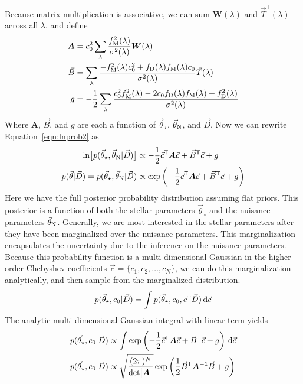 \documentclass[preprint]{aastex} %
\newcommand{\vt}{\vec{\theta}}
\newcommand{\vstar}{\vt_{\star}}
\newcommand{\vN}{\vt_{\rm N}}
\newcommand{\vc}{\vec{c}}
\newcommand{\fM}{f_{\rm M}}
\newcommand{\fD}{f_{\rm D}}
\newcommand{\vD}{\vec{D}}
\newcommand{\dd}{\,{\rm d}}
\newcommand{\trans}{\mathsf{T}}
\begin{document}
Because matrix multiplication is associative, we can sum ${\bm W(\lambda)}$ and $\vec{T}^\trans(\lambda)$ across all $\lambda$, and define
\begin{align}
  {\bm A} &= c_0^2 \sum_{\lambda} \frac{\fM^2(\lambda)}{\sigma^2(\lambda)} {\bm W}(\lambda) \\
  \vec{B} &= \sum_{\lambda} \frac{-\fM^2(\lambda) c_0^2 + \fD(\lambda) \fM (\lambda) c_0}{\sigma^2(\lambda)} \vec{T}(\lambda)\\
  g &= -\frac{1}{2} \sum_{\lambda} \frac{c_0^2 \fM^2(\lambda) - 2 c_0 \fD(\lambda) \fM(\lambda) + \fD^2(\lambda)}{\sigma^2(\lambda)} 
\end{align}
Where ${\bm A}$, $\vec{B}$, and $g$ are each a function of $\vstar$, $\vN$, and $\vD$. Now we can rewrite Equation~\ref{eqn:lnprob2} as 
\begin{align}
  \ln \bigl [p(\vstar, \vN | \vD) \bigr] &\propto - \frac{1}{2} \vc^\trans {\bm A} \vc + \vec{B}^\trans \vc + g\\
  p(\vt | \vD) = p(\vstar, \vN | \vD) &\propto \exp \left ( - \frac{1}{2} \vc^\trans {\bm A} \vc + \vec{B}^\trans \vc + g \right )
  \label{eqn:lnprob_matrix}
\end{align}
Here we have the full posterior probability distribution assuming flat priors. This posterior is a function of both the stellar parameters $\vstar$ and the nuisance parameters $\vN$. Generally, we are most interested in the stellar parameters after they have been marginalized over the nuisance parameters. This marginalization encapsulates the uncertainty due to the inference on the nuisance parameters. Because this probability function is a multi-dimensional Gaussian in the higher order Chebyshev coefficients $\vc = \{c_1, c_2, \ldots, c_N \}$, we can do this marginalization analytically, and then sample from the marginalized distribution. 
\begin{equation}
  p(\vstar, c_0 | \vD) = \int p(\vstar, c_0, \vc\; | \vD) \dd \vc
\end{equation}
The analytic multi-dimensional Gaussian integral with linear term \citep{sgd+09} yields 
\begin{align}
  p(\vstar, c_0 | \vD) &\propto \int \exp \left ( - \frac{1}{2} \vc^\trans {\bm A} \vc + \vec{B}^\trans \vc + g \right ) \dd \vc\\
  p(\vstar, c_0 | \vD) &\propto \sqrt{\frac{(2 \pi )^N}{ {\rm det} \bigl |{\bm A} \bigr |}} \exp{ \left ( \frac{1}{2} \vec{B}^\trans {\bm A}^{-1} \vec{B} + g \right )}
\end{align}
\end{document}
